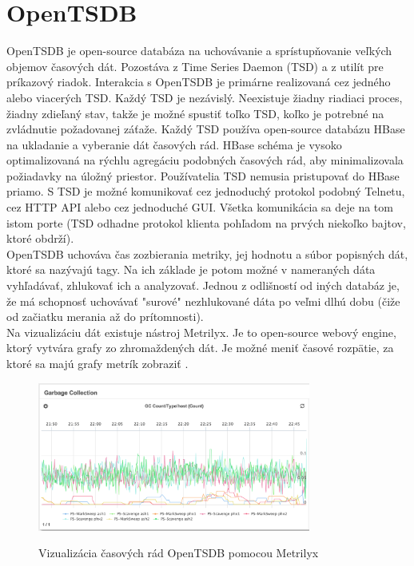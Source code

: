 \documentclass[11pt,final,oneside]{fithesis}
\begin{document}
\section{OpenTSDB}
OpenTSDB je open-source databáza na uchovávanie a sprístupňovanie veľkých objemov časových dát. Pozostáva z Time Series Daemon (TSD) a z utilít pre príkazový riadok. Interakcia s OpenTSDB je primárne realizovaná cez jedného alebo viacerých TSD. Každý TSD je nezávislý.
Neexistuje žiadny riadiaci proces, žiadny zdieľaný stav, takže je možné spustiť toľko TSD, koľko je potrebné na zvládnutie požadovanej záťaže. Každý TSD používa open-source databázu HBase
na ukladanie a vyberanie dát časových rád. HBase schéma je vysoko optimalizovaná na rýchlu agregáciu podobných časových rád, aby minimalizovala požiadavky na úložný priestor. 
Používatelia TSD nemusia pristupovať do HBase priamo. S TSD je možné komunikovať cez jednoduchý protokol podobný Telnetu, cez HTTP API alebo cez jednoduché GUI. Všetka komunikácia
sa deje na tom istom porte (TSD odhadne protokol klienta pohľadom na prvých niekoľko bajtov, ktoré obdrží).\cite{openTSDB}
\\OpenTSDB uchováva čas zozbierania metriky, jej hodnotu a súbor popisných dát, ktoré sa nazývajú tagy. Na ich základe je potom možné
v nameraných dáta vyhľadávať, zhlukovať ich a analyzovať. Jednou z odlišností od iných databáz je, že má schopnosť uchovávať "surové" nezhlukované dáta po veľmi dlhú dobu (čiže od začiatku merania až do prítomnosti).
\\Na vizualizáciu dát existuje nástroj Metrilyx. Je to open-source webový engine, ktorý vytvára grafy zo zhromaždených dát. Je možné meniť časové rozpätie, za ktoré sa majú grafy metrík zobraziť .
\begin{figure}[h]
\begin{center}
       \includegraphics[width=0.8\textwidth]{images/metrilyx.png}
       \caption{Vizualizácia časových rád OpenTSDB pomocou Metrilyx}\cite{Metrilyx}
\end{center}
\end{figure}
\end{document}

